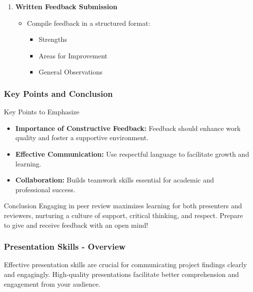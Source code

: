 \documentclass[aspectratio=169]{beamer}
\begin{document}
\begin{frame}[fragile]
\begin{enumerate}
        \item \textbf{Written Feedback Submission}
            \begin{itemize}
                \item Compile feedback in a structured format:
                    \begin{itemize}
                        \item Strengths
                        \item Areas for Improvement
                        \item General Observations
                    \end{itemize}
            \end{itemize}
    \end{enumerate}
\end{frame}

\begin{frame}[fragile]
    \frametitle{Key Points and Conclusion}
    \begin{block}{Key Points to Emphasize}
        \begin{itemize}
            \item \textbf{Importance of Constructive Feedback:}
                Feedback should enhance work quality and foster a supportive environment.
            \item \textbf{Effective Communication:}
                Use respectful language to facilitate growth and learning.
            \item \textbf{Collaboration:}
                Builds teamwork skills essential for academic and professional success.
        \end{itemize}
    \end{block}
    
    \begin{block}{Conclusion}
        Engaging in peer review maximizes learning for both presenters and reviewers, nurturing a culture of support, critical thinking, and respect. Prepare to give and receive feedback with an open mind!
    \end{block}
\end{frame}

\begin{frame}[fragile]
    \frametitle{Presentation Skills - Overview}
    Effective presentation skills are crucial for communicating project findings clearly and engagingly. High-quality presentations facilitate better comprehension and engagement from your audience.
\end{frame}
\end{document}
